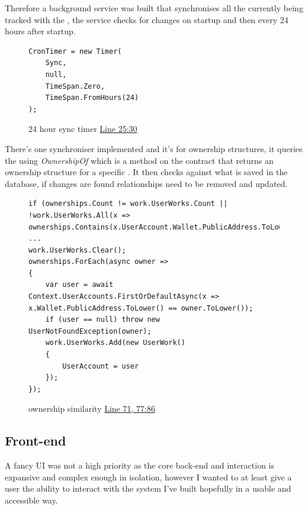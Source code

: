 Therefore a background service was built that synchronises all the  currently being tracked with the , the service checks for changes on startup and then every 24 hours after startup.

\begin{figure}[H]
\caption{24 hour sync timer \href{https://github.com/MrHarrisonBarker/CRPL/blob/main/CRPL.Web/Core/ChainSync/ChainSyncService.cs}{Line 25:30}}
\centering
\begin{lstlisting}[language=CSharp]
CronTimer = new Timer(
	Sync,
	null,
	TimeSpan.Zero,
	TimeSpan.FromHours(24)
);
\end{lstlisting}
\end{figure}

There's one synchroniser implemented and it's for ownership structures, it queries the  using \textit{OwnershipOf} which is a method on the contract that returns an ownership structure for a specific . It then checks against what is saved in the database, if changes are found relationships need to be removed and updated.

\begin{figure}[H]
\caption{ownership similarity \href{https://github.com/MrHarrisonBarker/CRPL/blob/main/CRPL.Web/Core/ChainSync/Synchronisers/OwnershipSynchroniser.cs}{Line 71, 77:86}}
\centering
\begin{lstlisting}[language=CSharp]
if (ownerships.Count != work.UserWorks.Count || !work.UserWorks.All(x => ownerships.Contains(x.UserAccount.Wallet.PublicAddress.ToLower())))
...
work.UserWorks.Clear();
ownerships.ForEach(async owner =>
{
	var user = await Context.UserAccounts.FirstOrDefaultAsync(x => x.Wallet.PublicAddress.ToLower() == owner.ToLower());
	if (user == null) throw new UserNotFoundException(owner);
	work.UserWorks.Add(new UserWork()
	{
		UserAccount = user
	});
});
\end{lstlisting}
\end{figure}

\subsection{Front-end}

A fancy UI was not a high priority as the core back-end and  interaction is expansive and complex enough in isolation, however I wanted to at least give a user the ability to interact with the system I've built hopefully in a usable and accessible way.

